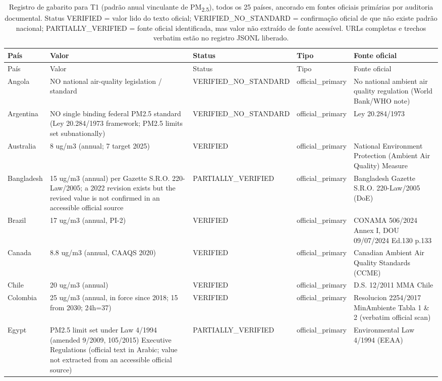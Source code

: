 \begin{longtable}{llp{3.0cm}lp{4.6cm}}
\caption{Registro de gabarito para T1 (padrão anual vinculante de PM\textsubscript{2.5}), todos os 25 países, ancorado em fontes oficiais primárias por auditoria documental. Status VERIFIED = valor lido do texto oficial; VERIFIED\_NO\_STANDARD = confirmação oficial de que não existe padrão nacional; PARTIALLY\_VERIFIED = fonte oficial identificada, mas valor não extraído de fonte acessível. URLs completas e trechos verbatim estão no registro JSONL liberado.\label{tab:s-groundtruth}}\\
\toprule
País & Valor & Status & Tipo & Fonte oficial \\
\midrule \endfirsthead
\toprule País & Valor & Status & Tipo & Fonte oficial \\ \midrule \endhead
Angola & NO national air-quality legislation / standard & VERIFIED\_NO\_STANDARD & official\_primary & No national ambient air quality regulation (World Bank/WHO note) \\
Argentina & NO single binding federal PM2.5 standard (Ley 20.284/1973 framework; PM2.5 limits set subnationally) & VERIFIED\_NO\_STANDARD & official\_primary & Ley 20.284/1973 \\
Australia & 8 ug/m3 (annual; 7 target 2025) & VERIFIED & official\_primary & National Environment Protection (Ambient Air Quality) Measure \\
Bangladesh & 15 ug/m3 (annual) per Gazette S.R.O. 220-Law/2005; a 2022 revision exists but the revised value is not confirmed in an accessible official source & PARTIALLY\_VERIFIED & official\_primary & Bangladesh Gazette S.R.O. 220-Law/2005 (DoE) \\
Brazil & 17 ug/m3 (annual, PI-2) & VERIFIED & official\_primary & CONAMA 506/2024 Annex I, DOU 09/07/2024 Ed.130 p.133 \\
Canada & 8.8 ug/m3 (annual, CAAQS 2020) & VERIFIED & official\_primary & Canadian Ambient Air Quality Standards (CCME) \\
Chile & 20 ug/m3 (annual) & VERIFIED & official\_primary & D.S. 12/2011 MMA Chile \\
Colombia & 25 ug/m3 (annual, in force since 2018; 15 from 2030; 24h=37) & VERIFIED & official\_primary & Resolucion 2254/2017 MinAmbiente Tabla 1 \& 2 (verbatim official scan) \\
Egypt & PM2.5 limit set under Law 4/1994 (amended 9/2009, 105/2015) Executive Regulations (official text in Arabic; value not extracted from an accessible official source) & PARTIALLY\_VERIFIED & official\_primary & Environmental Law 4/1994 (EEAA) \\

\end{longtable}
